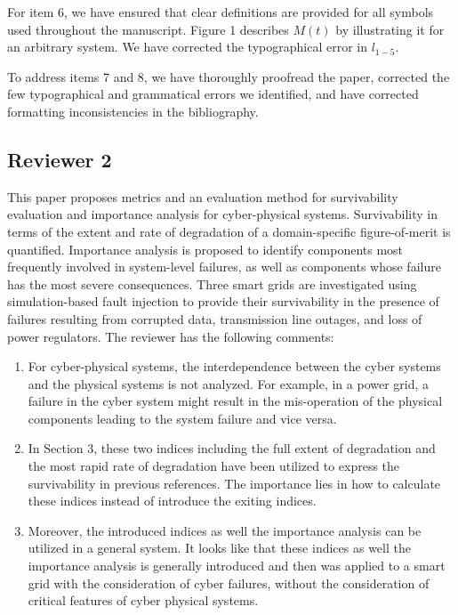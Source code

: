 \documentclass{article}
\newenvironment{response}{
  \doublespacing
  \setlength\parindent{0.05\linewidth}
  \ttfamily
}{}
\begin{document}
\begin{response}
For item 6, we have ensured that clear definitions are provided for all symbols used throughout the manuscript. Figure 1 describes $M(t)$ by illustrating it for an arbitrary system. We have corrected the typographical error in $l_{1-5}$.

To address items 7 and 8, we have thoroughly proofread the paper, corrected the few typographical and grammatical errors we identified, and have corrected formatting inconsistencies in the bibliography.
\end{response}

\subsection{Reviewer 2}
\label{sec:reviewer:r2}
This paper proposes metrics and an evaluation method for survivability evaluation and importance analysis for cyber-physical systems. Survivability in terms of the extent and rate of degradation of a domain-specific figure-of-merit is quantified. Importance analysis is proposed to identify components most frequently involved in system-level failures, as well as components whose failure has the most severe consequences. Three smart grids are investigated using simulation-based fault injection to provide their survivability in the presence of failures resulting from corrupted data, transmission line outages, and loss of power regulators. The reviewer has the following comments:

\begin{enumerate}
  \item For cyber-physical systems, the interdependence between the cyber systems and the physical systems is not analyzed. For example, in a power grid, a failure in the cyber system might result in the mis-operation of the physical components leading to the system failure and vice versa.
  \item In Section 3, these two indices including the full extent of degradation and the most rapid rate of degradation have been utilized to express the survivability in previous references. The importance lies in how to calculate these indices instead of introduce the exiting indices.
  \item Moreover, the introduced indices as well the importance analysis can be utilized in a general system. It looks like that these indices as well the importance analysis is generally introduced and then was applied to a smart grid with the consideration of cyber failures, without the consideration of critical features of cyber physical systems.
\end{enumerate}
\end{document}
